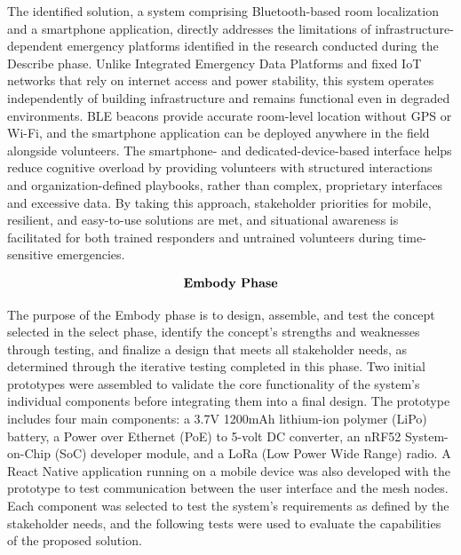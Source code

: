 \documentclass[english,12pt,a4paper,titlepage]{article}
\begin{document}
	The identified solution, a system comprising Bluetooth-based room localization and a smartphone application, directly addresses the limitations of infrastructure-dependent emergency platforms identified in the research conducted during the Describe phase. Unlike Integrated Emergency Data Platforms and fixed IoT networks that rely on internet access and power stability, this system operates independently of building infrastructure and remains functional even in degraded environments. BLE beacons provide accurate room-level location without GPS or Wi-Fi, and the smartphone application can be deployed anywhere in the field alongside volunteers. The smartphone- and dedicated-device-based interface helps reduce cognitive overload by providing volunteers with structured interactions and organization-defined playbooks, rather than complex, proprietary interfaces and excessive data. By taking this approach, stakeholder priorities for mobile, resilient, and easy-to-use solutions are met, and situational awareness is facilitated for both trained responders and untrained volunteers during time-sensitive emergencies.
	
	\[
	\begin{array}{cc}
		\mbox{\bfseries{Embody Phase}}
		\label{Embody Phase}
	\end{array}
	\]
	
    The purpose of the Embody phase is to design, assemble, and test the concept selected in the select phase, identify the concept's strengths and weaknesses through testing, and finalize a design that meets all stakeholder needs, as determined through the iterative testing completed in this phase. Two initial prototypes were assembled to validate the core functionality of the system's individual components before integrating them into a final design. The prototype includes four main components: a 3.7V 1200mAh lithium-ion polymer (LiPo) battery, a Power over Ethernet (PoE) to 5-volt DC converter, an nRF52 System-on-Chip (SoC) developer module, and a LoRa (Low Power Wide Range) radio. A React Native application running on a mobile device was also developed with the  prototype to test communication between the user interface and the mesh nodes. Each component was selected to test the system's requirements as defined by the stakeholder needs, and the following tests were used to evaluate the capabilities of the proposed solution. 
	
\end{document}
